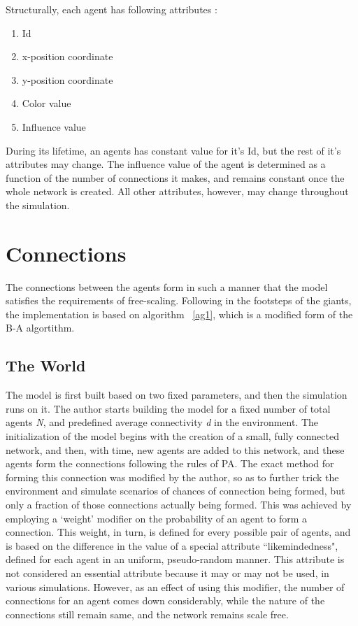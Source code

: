 Structurally, each agent has following attributes :

\begin{enumerate}
\item Id
\item x-position coordinate
\item y-position coordinate
\item Color value
\item Influence value
\end{enumerate}

During its lifetime, an agents has constant value for it's Id, but the rest of it's attributes may change. The influence value of the agent is determined as a function of the number of connections it makes, and remains constant once the whole network is created. All other attributes, however, may change throughout the simulation.


\section{Connections}
The connections between the agents form in such a manner that the model satisfies the requirements of free-scaling. 
Following in the footsteps of the giants, the implementation is based on algorithm ~\ref{ag1}, which is a modified form of the B-A algortithm.

\subsection{The World}
The model is first built based on two fixed parameters, and then the simulation runs on it.
The author starts building the model for a fixed number of total agents \emph{N}, and predefined average connectivity \emph{d} in the environment.
The initialization of the model begins with the creation of a small, fully connected network, and then, with time, new agents are added to this network, and these agents form the connections following the rules of PA.
The exact method for forming this connection was modified by the author, so as to further trick the environment and simulate scenarios of chances of connection being formed, but only a fraction of those connections actually being formed. This was achieved by employing a `weight' modifier on the probability of an agent to form a connection. This weight, in turn, is defined for every possible pair of agents, and is based on the difference in the value of a special attribute ``likemindedness", defined for each agent in an uniform, pseudo-random manner.
This attribute is not considered an essential attribute because it may or may not be used, in various simulations. However, as an effect of using this modifier, the number of connections for an agent comes down considerably, while the nature of the connections still remain same, and the network remains scale free.


